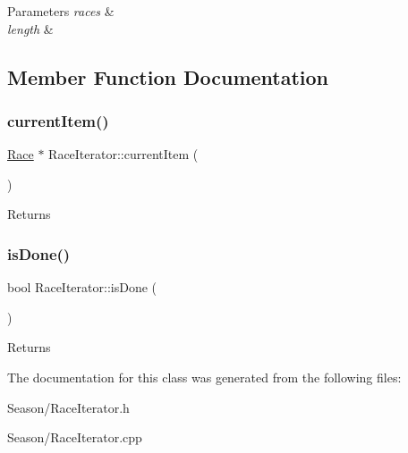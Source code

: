 \begin{DoxyParams}{Parameters}
{\em races} & \\
\hline
{\em length} & \\
\hline
\end{DoxyParams}


\subsection{Member Function Documentation}
\mbox{\label{classRaceIterator_adceb8655316b9b0ca00dbe4494ece887}} 
\subsubsection{\texorpdfstring{current\+Item()}{currentItem()}}
{\footnotesize\ttfamily \hyperlink{classRace}{Race} $\ast$ Race\+Iterator\+::current\+Item (\begin{DoxyParamCaption}{ }\end{DoxyParamCaption})}

\begin{DoxyReturn}{Returns}

\end{DoxyReturn}
\mbox{\label{classRaceIterator_a406ce41eae09904a94502f80344f537d}} 
\subsubsection{\texorpdfstring{is\+Done()}{isDone()}}
{\footnotesize\ttfamily bool Race\+Iterator\+::is\+Done (\begin{DoxyParamCaption}{ }\end{DoxyParamCaption})}

\begin{DoxyReturn}{Returns}

\end{DoxyReturn}


The documentation for this class was generated from the following files\+:\begin{DoxyCompactItemize}
\item 
Season/Race\+Iterator.\+h\item 
Season/Race\+Iterator.\+cpp\end{DoxyCompactItemize}

